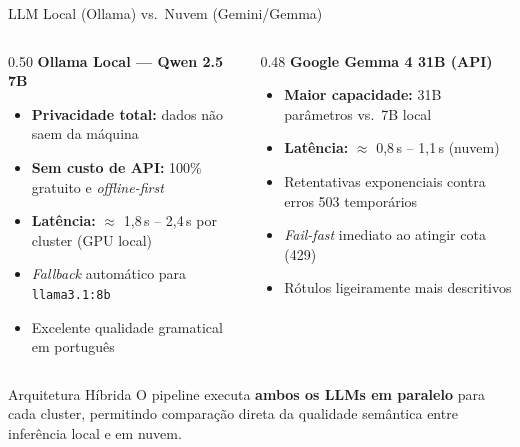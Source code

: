 \documentclass[aspectratio=169]{beamer}
\begin{document}
\begin{frame}{LLM Local (Ollama) vs.\ Nuvem (Gemini/Gemma)}
  \begin{columns}[T]
    \begin{column}{0.50\textwidth}
      \textbf{\color{ufrnblue}Ollama Local — Qwen 2.5 7B}
      \begin{itemize}\small
        \item \textbf{Privacidade total:} dados não saem da máquina
        \item \textbf{Sem custo de API:} 100\% gratuito e \textit{offline-first}
        \item \textbf{Latência:} $\approx$ 1{,}8\,s -- 2{,}4\,s por cluster (GPU local)
        \item \textit{Fallback} automático para \texttt{llama3.1:8b}
        \item Excelente qualidade gramatical em português
      \end{itemize}
    \end{column}
    \begin{column}{0.48\textwidth}
      \textbf{\color{ufrnblue}Google Gemma 4 31B (API)}
      \begin{itemize}\small
        \item \textbf{Maior capacidade:} 31B parâmetros vs.\ 7B local
        \item \textbf{Latência:} $\approx$ 0{,}8\,s -- 1{,}1\,s (nuvem)
        \item Retentativas exponenciais contra erros 503 temporários
        \item \textit{Fail-fast} imediato ao atingir cota (429)
        \item Rótulos ligeiramente mais descritivos
      \end{itemize}
    \end{column}
  \end{columns}
  \vspace{0.3em}
  \begin{alertblock}{Arquitetura Híbrida}
    \small O pipeline executa \textbf{ambos os LLMs em paralelo} para cada
    cluster, permitindo comparação direta da qualidade semântica entre
    inferência local e em nuvem.
  \end{alertblock}
\end{frame}

\end{document}
